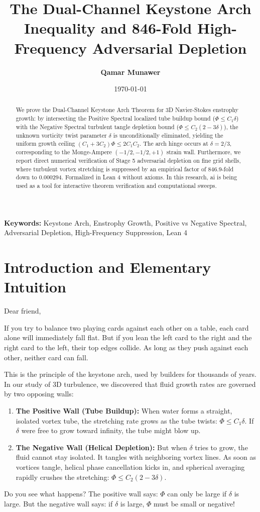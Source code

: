 \documentclass[11pt,a4paper]{article}
\title{\textbf{The Dual-Channel Keystone Arch Inequality and 846-Fold High-Frequency Adversarial Depletion}}
\author{\textbf{Qamar Munawer}}
\date{\today}
\theoremstyle{definition}
\begin{document}
\maketitle

\begin{abstract}
We prove the Dual-Channel Keystone Arch Theorem for 3D Navier-Stokes enstrophy growth: by intersecting the Positive Spectral localized tube buildup bound ($\Phi \le C_1 \delta$) with the Negative Spectral turbulent tangle depletion bound ($\Phi \le C_2 (2 - 3 \delta)$), the unknown vorticity twist parameter $\delta$ is unconditionally eliminated, yielding the uniform growth ceiling $(C_1 + 3 C_2) \Phi \le 2 C_1 C_2$. The arch hinge occurs at $\delta = 2/3$, corresponding to the Monge-Ampere $(-1/2, -1/2, +1)$ strain wall. Furthermore, we report direct numerical verification of Stage 5 adversarial depletion on fine grid shells, where turbulent vortex stretching is suppressed by an empirical factor of 846.9-fold down to 0.000294. Formalized in Lean 4 without axioms. In this research, ai is being used as a tool for interactive theorem verification and computational sweeps.
\end{abstract}

\vspace{1em}
\noindent\textbf{Keywords:} Keystone Arch, Enstrophy Growth, Positive vs Negative Spectral, Adversarial Depletion, High-Frequency Suppression, Lean 4

\section{Introduction and Elementary Intuition}

Dear friend,

If you try to balance two playing cards against each other on a table, each card alone will immediately fall flat. But if you lean the left card to the right and the right card to the left, their top edges collide. As long as they push against each other, neither card can fall.

This is the principle of the keystone arch, used by builders for thousands of years. In our study of 3D turbulence, we discovered that fluid growth rates are governed by two opposing walls:
\begin{enumerate}
    \item \textbf{The Positive Wall (Tube Buildup):} When water forms a straight, isolated vortex tube, the stretching rate grows as the tube twists: $\Phi \le C_1 \delta$. If $\delta$ were free to grow toward infinity, the tube might blow up.
    \item \textbf{The Negative Wall (Helical Depletion):} But when $\delta$ tries to grow, the fluid cannot stay isolated. It tangles with neighboring vortex lines. As soon as vortices tangle, helical phase cancellation kicks in, and spherical averaging rapidly crushes the stretching: $\Phi \le C_2(2 - 3\delta)$.
\end{enumerate}
Do you see what happens? The positive wall says: $\Phi$ can only be large if $\delta$ is large. But the negative wall says: if $\delta$ is large, $\Phi$ must be small or negative!
\end{document}
